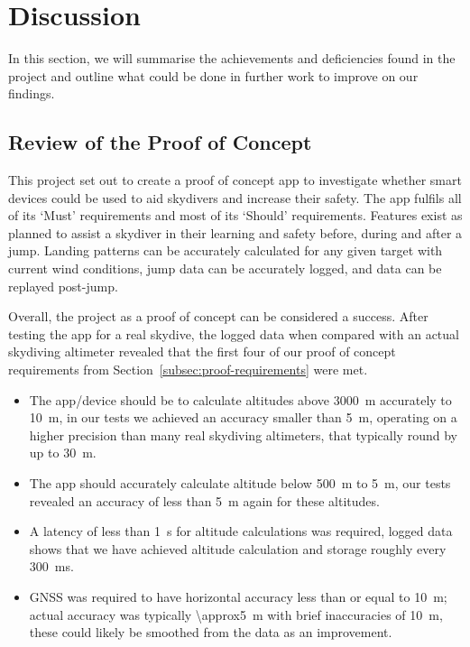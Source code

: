 \section{Discussion}\label{sec:discussion}
In this section, we will summarise the achievements and deficiencies found in the project and outline what could be done in further work to improve on our findings.


\subsection{Review of the Proof of Concept}
This project set out to create a proof of concept app to investigate whether smart devices could be used to aid skydivers and increase their safety.
The app fulfils all of its `Must' requirements and most of its `Should' requirements.
Features exist as planned to assist a skydiver in their learning and safety before, during and after a jump. Landing patterns can be accurately calculated for any given target with current wind conditions, jump data can be accurately logged, and data can be replayed post-jump.

Overall, the project as a proof of concept can be considered a success. After testing the app for a real skydive, the logged data when compared with an actual skydiving altimeter revealed that the first four of our proof of concept requirements from Section~\ref{subsec:proof-requirements} were met.

\begin{itemize}
  \item The app/device should be to calculate altitudes above \SI{3000}{\metre} accurately to \SI{10}{\metre}, in our tests we achieved an accuracy smaller than \SI{5}{\metre}, operating on a higher precision than many real skydiving altimeters, that typically round by up to \SI{30}{\metre}.

  \item The app should accurately calculate altitude below \SI{500}{\metre} to \SI{5}{\metre}, our tests revealed an accuracy of less than \SI{5}{\metre} again for these altitudes.

\item A latency of less than \SI{1}{\second} for altitude calculations was required, logged data shows that we have achieved altitude calculation and storage roughly every \SI{300}{\milli\second}.

\item GNSS was required to have horizontal accuracy less than or equal to \SI{10}{\metre}; actual accuracy was typically \SI{\approx5}{\metre} with brief inaccuracies of \SI{10}{\metre}, these could likely be smoothed from the data as an improvement.
\end{itemize}

